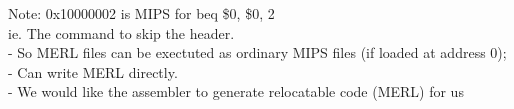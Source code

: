 \documentclass[12pt]{article}
\begin{document}
	Note: 0x10000002 is MIPS for beq \$0, \$0, 2\\
	ie. The command to skip the header.\\
	
	- So MERL files can be exectuted as ordinary MIPS files (if loaded at address 0);\\
	- Can write MERL directly.\\
	- We would like the assembler to generate relocatable code (MERL) for us\\
	
	
	
\end{document}
